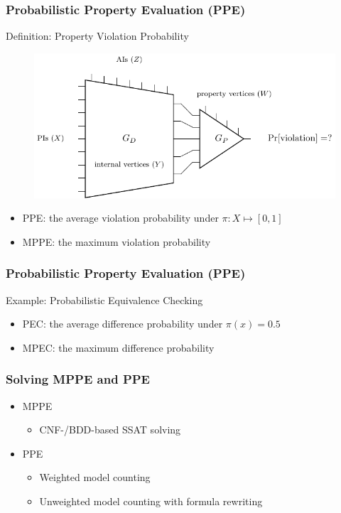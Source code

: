 \begin{frame}
  \frametitle{Probabilistic Property Evaluation (PPE)}
  \begin{block}{Definition: Property Violation Probability}
    \begin{figure}
      \centering
      \includegraphics[scale=0.8]{fig/prob-design-eval/prob-spbn-miter.pdf}
    \end{figure}
    \begin{itemize}
      \item PPE: the average violation probability under $\pi:X\mapsto[0,1]$
      \item MPPE: the maximum violation probability
    \end{itemize}
  \end{block}
\end{frame}

\begin{frame}
  \frametitle{Probabilistic Property Evaluation (PPE)}
  \begin{block}{Example: Probabilistic Equivalence Checking}
    \begin{figure}
      \centering
      
    \end{figure}
    \begin{itemize}
      \item PEC: the average difference probability under $\pi(x)=0.5$
      \item MPEC: the maximum difference probability
    \end{itemize}
  \end{block}
\end{frame}

\begin{frame}
  \frametitle{Solving MPPE and PPE}
  \begin{itemize}
    \item MPPE
          \begin{itemize}
            \item CNF-/BDD-based SSAT solving
          \end{itemize}
          \pause
    \item PPE
          \begin{itemize}
            \item Weighted model counting
            \item Unweighted model counting with formula rewriting
          \end{itemize}
  \end{itemize}
\end{frame}

